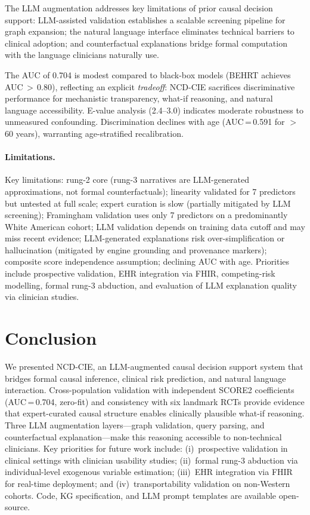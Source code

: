 \documentclass[runningheads]{llncs}
\begin{document}
The LLM augmentation addresses key limitations of prior causal
decision support: LLM-assisted validation establishes a scalable
screening pipeline for graph expansion; the natural language
interface eliminates technical barriers to clinical adoption; and
counterfactual explanations bridge formal computation with the
language clinicians naturally use.

The AUC of 0.704 is modest compared to black-box models
(BEHRT achieves AUC\,$>$\,0.80), reflecting an explicit
\emph{tradeoff}: NCD-CIE sacrifices discriminative performance for
mechanistic transparency, what-if reasoning, and natural language
accessibility.
E-value analysis (2.4--3.0) indicates moderate robustness to
unmeasured confounding.
Discrimination declines with age (AUC\,=\,0.591 for $>$60 years),
warranting age-stratified recalibration.

\paragraph{Limitations.}
Key limitations: rung-2 core (rung-3 narratives are LLM-generated
approximations, not formal counterfactuals); linearity
validated for 7 predictors but untested at full scale; expert
curation is slow (partially mitigated by LLM screening);
Framingham validation uses only 7 predictors on a predominantly
White American cohort; LLM validation depends on training data
cutoff and may miss recent evidence; LLM-generated explanations
risk over-simplification or hallucination (mitigated by engine
grounding and provenance markers); composite score independence
assumption; declining AUC with age.
Priorities include prospective validation, EHR integration via
FHIR, competing-risk modelling, formal rung-3 abduction, and
evaluation of LLM explanation quality via clinician studies.

\section{Conclusion}\label{sec:conclusion}

We presented NCD-CIE, an LLM-augmented causal decision support
system that bridges formal causal inference, clinical risk
prediction, and natural language interaction.
Cross-population validation with independent SCORE2 coefficients
(AUC\,=\,0.704, zero-fit) and consistency with six landmark RCTs
provide evidence that expert-curated causal structure enables
clinically plausible what-if reasoning.
Three LLM augmentation layers---graph validation, query parsing,
and counterfactual explanation---make this reasoning accessible
to non-technical clinicians.
Key priorities for future work include: (i)~prospective validation
in clinical settings with clinician usability studies;
(ii)~formal rung-3 abduction via individual-level exogenous
variable estimation; (iii)~EHR integration via FHIR for
real-time deployment; and (iv)~transportability validation on
non-Western cohorts.
Code, KG specification, and LLM prompt templates are available
open-source.
\end{document}
